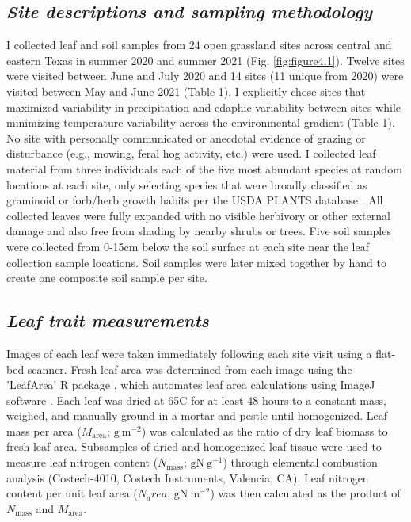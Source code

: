 \subsection{\textit{Site descriptions and sampling methodology}}
\noindent I collected leaf and soil samples from 24 open grassland sites across central and eastern Texas in summer 2020 and summer 2021 (Fig. \ref{fig:figure4.1}). Twelve sites were visited between June and July 2020 and 14 sites (11 unique from 2020) were visited between May and June 2021 (Table 1). I explicitly chose sites that maximized variability in precipitation and edaphic variability between sites while minimizing temperature variability across the environmental gradient (Table 1). No site with personally communicated or anecdotal evidence of grazing or disturbance (e.g., mowing, feral hog activity, etc.) were used. I collected leaf material from three individuals each of the five most abundant species at random locations at each site, only  selecting species that were broadly classified as graminoid or forb/herb growth habits per the USDA PLANTS database . All collected leaves were fully expanded with no visible herbivory or other external damage and also free from shading by nearby shrubs or trees. Five soil samples were collected from 0-15cm below the soil surface at each site near the leaf collection sample locations. Soil samples were later mixed together by hand to create one composite soil sample per site.

\subsection{\textit{Leaf trait measurements}}
\noindent Images of each leaf were taken immediately following each site visit using a flat-bed scanner. Fresh leaf area was determined from each image using the 'LeafArea' R package , which automates leaf area calculations using ImageJ software . Each leaf was dried at 65\textdegree{}C for at least 48 hours to a constant mass, weighed, and manually ground in a mortar and pestle until homogenized. Leaf mass per area ($M_\mathrm{area}$; $\mathrm{g\ m^{-2}}$) was calculated as the ratio of dry leaf biomass to fresh leaf area. Subsamples of dried and homogenized leaf tissue were used to measure leaf nitrogen content ($N_\mathrm{mass}$; $\mathrm{gN\ g^{-1}}$) through elemental combustion analysis (Costech-4010, Costech Instruments, Valencia, CA). Leaf nitrogen content per unit leaf area ($N_area$; $\mathrm{gN\ m^{-2}}$) was then calculated as the product of $N_\mathrm{mass}$ and $M_\mathrm{area}$.
    
